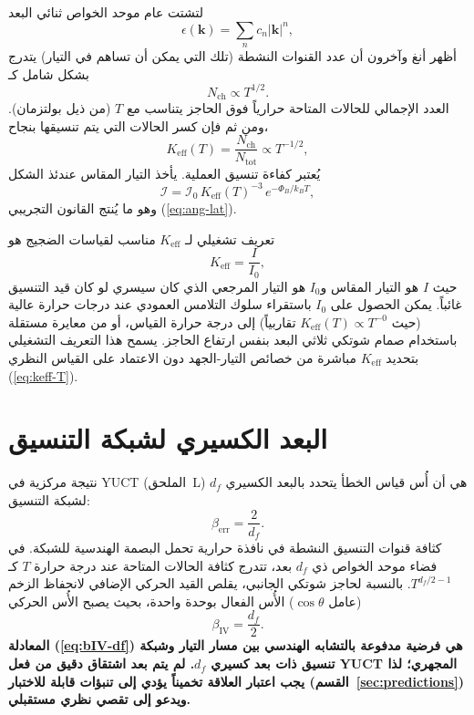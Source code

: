 \documentclass[11pt,a4paper]{article}
\newcommand{\Keff}{K_{\mathrm{eff}}}
\begin{document}
	لتشتت عام موحد الخواص ثنائي البعد
	\begin{equation}
		\epsilon(\mathbf{k}) = \sum_n c_n |\mathbf{k}|^n,
		\label{eq:dispersion}
	\end{equation}
	أظهر أنغ وآخرون أن عدد القنوات النشطة (تلك التي يمكن أن تساهم في التيار) يتدرج بشكل شامل كـ
	\begin{equation}
		N_{\mathrm{ch}} \propto T^{1/2}.
		\label{eq:Nch}
	\end{equation}
	العدد الإجمالي للحالات المتاحة حرارياً فوق الحاجز يتناسب مع \(T\) (من ذيل بولتزمان). ومن ثم فإن كسر الحالات التي يتم تنسيقها بنجاح،
	\begin{equation}
		\Keff(T) = \frac{N_{\mathrm{ch}}}{N_{\mathrm{tot}}} \propto T^{-1/2},
		\label{eq:keff-T}
	\end{equation}
	يُعتبر كفاءة تنسيق العملية. يأخذ التيار المقاس عندئذ الشكل
	\begin{equation}
		\mathcal{I} = \mathcal{I}_0 \, \Keff(T)^{-3} \, e^{-\Phi_B/k_B T},
		\label{eq:I-via-keff}
	\end{equation}
	وهو ما يُنتج القانون التجريبي (\ref{eq:ang-lat}).
	
	تعريف تشغيلي لـ \(\Keff\) مناسب لقياسات الضجيج هو
	\begin{equation}
		\Keff = \frac{I}{I_0},
		\label{eq:keff-operational}
	\end{equation}
	حيث \(I\) هو التيار المقاس و\(I_0\) هو التيار المرجعي الذي كان سيسري لو كان قيد التنسيق غائباً. يمكن الحصول على \(I_0\) باستقراء سلوك التلامس العمودي عند درجات حرارة عالية (حيث \(\Keff(T) \propto T^{-0}\) تقاربياً) إلى درجة حرارة القياس، أو من معايرة مستقلة باستخدام صمام شوتكي ثلاثي البعد بنفس ارتفاع الحاجز. يسمح هذا التعريف التشغيلي بتحديد \(\Keff\) مباشرة من خصائص التيار-الجهد دون الاعتماد على القياس النظري (\ref{eq:keff-T}).
	
	\section{البعد الكسيري لشبكة التنسيق}
	
	نتيجة مركزية في YUCT (الملحق~L) هي أن أُس قياس الخطأ يتحدد بالبعد الكسيري \(d_f\) لشبكة التنسيق:
	\begin{equation}
		\beta_{\mathrm{err}} = \frac{2}{d_f}.
		\label{eq:beta-df}
	\end{equation}
	كثافة قنوات التنسيق النشطة في نافذة حرارية تحمل البصمة الهندسية للشبكة. في فضاء موحد الخواص ذي \(d_f\) بعد، تتدرج كثافة الحالات المتاحة عند درجة حرارة \(T\) كـ \(T^{d_f/2 - 1}\). بالنسبة لحاجز شوتكي الجانبي، يقلص القيد الحركي الإضافي لانحفاظ الزخم (عامل \(\cos\theta\)) الأُس الفعال بوحدة واحدة، بحيث يصبح الأُس الحركي
	\begin{equation}
		\beta_{\mathrm{IV}} = \frac{d_f}{2}.
		\label{eq:bIV-df}
	\end{equation}
	\textbf{المعادلة (\ref{eq:bIV-df}) هي فرضية مدفوعة بالتشابه الهندسي بين مسار التيار وشبكة تنسيق ذات بعد كسيري \(d_f\). لم يتم بعد اشتقاق دقيق من فعل YUCT المجهري؛ لذا يجب اعتبار العلاقة تخميناً يؤدي إلى تنبؤات قابلة للاختبار (القسم~\ref{sec:predictions}) ويدعو إلى تقصي نظري مستقبلي.}
	
\end{document}
